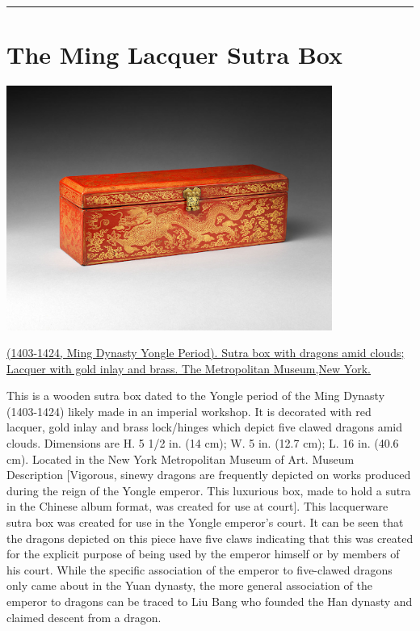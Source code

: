 \documentclass[
]{book}
\begin{document}
\begin{center}\rule{0.5\linewidth}{0.5pt}\end{center}

\hypertarget{the-ming-lacquer-sutra-box}{%
\section*{The Ming Lacquer Sutra Box}\label{the-ming-lacquer-sutra-box}}

\includegraphics[width=0.8\textwidth,height=\textheight]{images/Ming_Lacquer_Sutra_Box.png}

\href{https://www.metmuseum.org/art/collection/search/60870}{(1403-1424, Ming Dynasty Yongle Period). Sutra box with dragons amid clouds; Lacquer with gold inlay and brass. The Metropolitan Museum,New York.}

This is a wooden sutra box dated to the Yongle period of the Ming Dynasty (1403-1424) likely made in an imperial workshop. It is decorated with red lacquer, gold inlay and brass lock/hinges which depict five clawed dragons amid clouds. Dimensions are H. 5 1/2 in. (14 cm); W. 5 in. (12.7 cm); L. 16 in. (40.6 cm). Located in the New York Metropolitan Museum of Art. Museum Description {[}Vigorous, sinewy dragons are frequently depicted on works produced during the reign of the Yongle emperor. This luxurious box, made to hold a sutra in the Chinese album format, was created for use at court{]}.
This lacquerware sutra box was created for use in the Yongle emperor's court. It can be seen that the dragons depicted on this piece have five claws indicating that this was created for the explicit purpose of being used by the emperor himself or by members of his court. While the specific association of the emperor to five-clawed dragons only came about in the Yuan dynasty, the more general association of the emperor to dragons can be traced to Liu Bang who founded the Han dynasty and claimed descent from a dragon.
\end{document}
